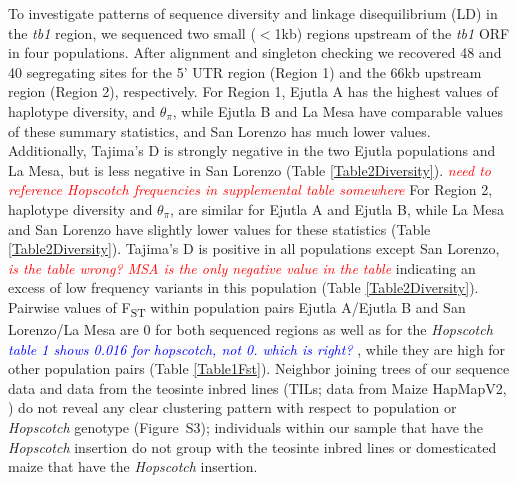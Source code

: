 \documentclass[11pt]{article}
\newcommand{\jri}[1]{\textcolor{blue}{ \emph{\scriptsize  #1}} }
\newcommand{\mbh}[1]{\textcolor{red}{ \emph{\scriptsize  #1}} }
\begin{document}
\begin{linenumbers}
\begin{flushleft}
To investigate patterns of sequence diversity and linkage disequilibrium (LD) in the \emph{tb1} region, we sequenced two small ($<$1kb) regions upstream of the \emph{tb1} ORF in four populations. After alignment and singleton checking we recovered 48 and 40 segregating sites for the 5' UTR region (Region 1) and the 66kb upstream region (Region 2), respectively. For Region 1, Ejutla A has the highest values of haplotype diversity, and $\theta_\pi$, while Ejutla B and La Mesa have comparable values of these summary statistics, and San Lorenzo has much lower values. Additionally, Tajima's D is strongly negative in the two Ejutla populations and La Mesa, but is less negative in San Lorenzo (Table \ref{Table2Diversity}). \mbh{need to reference \emph{Hopscotch} frequencies in supplemental table somewhere} For Region 2, haplotype diversity and $\theta_\pi$, are similar for Ejutla A and Ejutla B, while La Mesa and San Lorenzo have slightly lower values for these statistics (Table \ref{Table2Diversity}). Tajima's D is positive in all populations except San Lorenzo, \mbh{is the table wrong? MSA is the only negative value in the table} indicating an excess of low frequency variants in this population (Table \ref{Table2Diversity}). Pairwise values of F\textsubscript{ST} within population pairs Ejutla A/Ejutla B and San Lorenzo/La Mesa are 0 for both sequenced regions as well as for the \emph{Hopscotch} \jri{table 1 shows 0.016 for hopscotch, not 0. which is right?}, while they are high for other population pairs (Table \ref{Table1Fst}). Neighbor joining trees of our sequence data and data from the teosinte inbred lines (TILs; data from Maize HapMapV2, \citealt{Chia2012}) do not reveal any clear clustering pattern with respect to population or \emph{Hopscotch} genotype (Figure~S3); individuals within our sample that have the \emph{Hopscotch} insertion do not group with the teosinte inbred lines or domesticated maize that have the \emph{Hopscotch} insertion. 


\end{flushleft}
\end{linenumbers}
\end{document}
